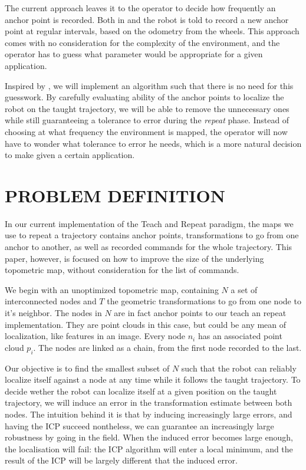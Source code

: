\documentclass[letterpaper,10 pt,conference]{ieeeconf}
\begin{document}
The current approach leaves it to the operator to decide how frequently an anchor point is
recorded. Both in \cite{Furgale10} and \cite{Sprunk13} the robot is told to record a new anchor
point at regular intervals, based on the odometry from the wheels. This approach comes with no
consideration for the complexity of the environment, and the operator has to guess what parameter
would be appropriate for a given application.

Inspired by \cite{Churchill15}, we will implement an algorithm such that there is no need for this
guesswork. By carefully evaluating ability of the anchor points to localize the robot on the taught
trajectory, we will be able to remove the unnecessary ones while still guaranteeing a tolerance to
error during the \textit{repeat} phase. Instead of choosing at what frequency the environment is
mapped, the operator will now have to wonder what tolerance to error he needs, which is a more
natural decision to make given a certain application.


\section{PROBLEM DEFINITION}

In our current implementation of the Teach and Repeat paradigm, the maps we use to repeat a
trajectory contains anchor points, transformations to go from one anchor to another, as well as
recorded commands for the whole trajectory. This paper, however, is focused on how to improve the
size of the underlying topometric map, without consideration for the list of commands.

We begin with an unoptimized topometric map, containing $N$ a set of interconnected nodes and $T$
the geometric transformations to go from one node to it's neighbor. The nodes in $N$ are in fact
anchor points to our teach an repeat implementation. They are point clouds in this case, but could
be any mean of localization, like features in an image. Every node $n_i$ has an associated point
cloud $p_i$. The nodes are linked as a chain, from the first node recorded to the last.

Our objective is to find the smallest subset of $N$ such that the robot can reliably localize itself
against a node at any time while it follows the taught trajectory. To decide wether the robot can
localize itself at a given position on the taught trajectory, we will induce an error in the
transformation estimate between both nodes. The intuition behind it is that by inducing increasingly
large errors, and having the ICP succeed nontheless, we can guarantee an increasingly large
robustness by going in the field. When the induced error becomes large enough, the localisation will
fail: the ICP algorithm will enter a local minimum, and the result of the ICP will be largely
different that the induced error.
\end{document}
